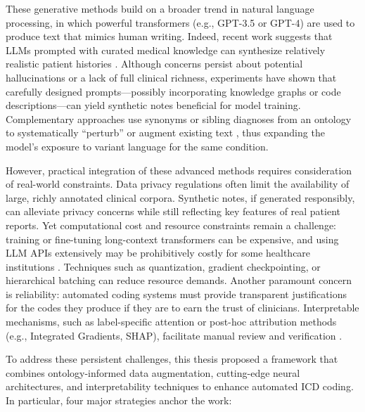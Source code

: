 These generative methods build on a broader trend in natural language processing, in which powerful transformers (e.g., GPT-3.5 or GPT-4) are used to produce text that mimics human writing. Indeed, recent work suggests that LLMs prompted with curated medical knowledge can synthesize relatively realistic patient histories \citep{yang2023fewshoticd}. Although concerns persist about potential hallucinations or a lack of full clinical richness, experiments have shown that carefully designed prompts---possibly incorporating knowledge graphs or code descriptions---can yield synthetic notes beneficial for model training. Complementary approaches use synonyms or sibling diagnoses from an ontology to systematically ``perturb'' or augment existing text \citep{yuan2022codesynonyms}, thus expanding the model's exposure to variant language for the same condition.

However, practical integration of these advanced methods requires consideration of real-world constraints. Data privacy regulations often limit the availability of large, richly annotated clinical corpora. Synthetic notes, if generated responsibly, can alleviate privacy concerns while still reflecting key features of real patient reports. Yet computational cost and resource constraints remain a challenge: training or fine-tuning long-context transformers can be expensive, and using LLM APIs extensively may be prohibitively costly for some healthcare institutions \citep{ji2021bert}. Techniques such as quantization, gradient checkpointing, or hierarchical batching \citep{geiping2023cramming} can reduce resource demands. Another paramount concern is reliability: automated coding systems must provide transparent justifications for the codes they produce if they are to earn the trust of clinicians. Interpretable mechanisms, such as label-specific attention or post-hoc attribution methods (e.g., Integrated Gradients, SHAP), facilitate manual review and verification \citep{teng2020explainable}.

To address these persistent challenges, this thesis proposed a framework that combines ontology-informed data augmentation, cutting-edge neural architectures, and interpretability techniques to enhance automated ICD coding. In particular, four major strategies anchor the work:

